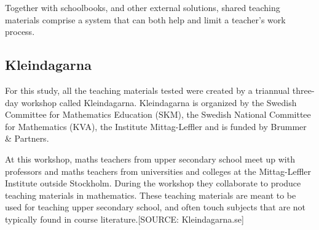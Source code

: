 Together with schoolbooks, and other external solutions, shared teaching materials comprise a system that can both help and limit a teacher's work process.

\subsection{Kleindagarna}
For this study, all the teaching materials tested were created by a triannual three-day workshop called Kleindagarna. Kleindagarna is organized by the Swedish Committee for Mathematics Education (SKM), the Swedish National Committee for Mathematics (KVA), the Institute Mittag-Leffler and is funded by Brummer \& Partners.

At this workshop, maths teachers from upper secondary school meet up with professors and maths teachers from universities and colleges at the Mittag-Leffler Institute outside Stockholm. During the workshop they collaborate to produce teaching materials in mathematics. These teaching materials are meant to be used for teaching upper secondary school, and often touch subjects that are not typically found in course literature.[SOURCE: Kleindagarna.se]
